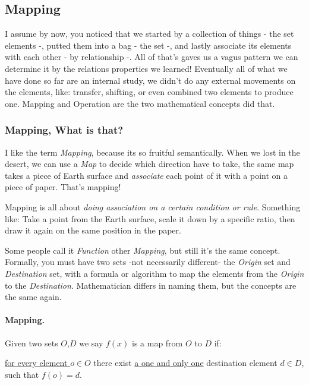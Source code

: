 
\subsection{Mapping}
I assume by now, you noticed that we started by a collection of things - the set elements -, putted them into a bag - the set -, and lastly associate its elements with each other - by relationship -. All of that's gaves us a vagus pattern we can determine it by the relations properties we learned! 
Eventually all of what we have done so far are an internal study, we didn't do any external movements on the elements, like: transfer, shifting, or even combined two elements to produce one. Mapping and Operation are the two mathematical concepts did that.

\subsubsection{Mapping, What is that?}
I like the term {\it Mapping}, because its so fruitful semantically. When we lost in the desert, we can use a {\it Map} to decide which direction have to take, the same map takes a piece of Earth surface and {\it associate} each point of it with a point on a piece of paper. That's mapping!

Mapping is all about {\it doing association on a certain condition or rule}. Something like: Take a point from the Earth surface, scale it down by a specific ratio, then draw it again on the same position in the paper.

Some people call it {\it Function} other {\it Mapping}, but still it's the same concept. Formally, you must have two sets -not necessarily different- the {\it Origin} set and {\it Destination} set, with a formula or algorithm to map the elements from the {\it Origin} to the {\it Destination}. Mathematician differs in naming them, but the concepts are the same again.

\paragraph{Mapping.} 
Given two sets $O$,$D$ we say $f(x)$ is a map from $O$ to $D$ if: 
    
    \underline{for every element $o \in O$} there exist \underline{a one and only one} destination element $d \in D$, such that $f(o)=d$.

